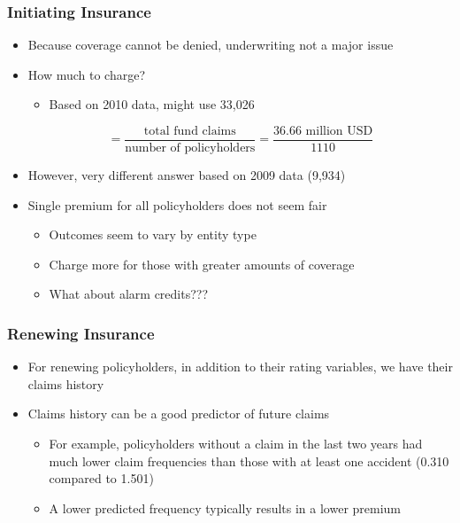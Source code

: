 \documentclass[serif,10pt]{beamer}
\begin{document}
\begin{frame}
\frametitle{Initiating Insurance}
  \begin{itemize}
\item Because coverage cannot be denied, underwriting not a major
issue \vspace{2mm}
\item How much to charge? \vspace{2mm}
  \begin{itemize}
\item Based on 2010 data, might use  33,026 \vspace{2mm}\end{itemize}
$$= \frac{{\text{total fund claims}}}{{\text{number of policyholders}}} = \frac{{\text{36.66 million
USD}}}{1110}$$ \vspace{2mm}
\item However, very different answer based on 2009 data (9,934) \vspace{2mm}
\item Single premium for all policyholders does not seem fair \vspace{2mm}
\begin{itemize}
\item Outcomes seem to vary by entity type \vspace{2mm}
\item Charge more for those with greater amounts of coverage \vspace{2mm}
\item What about alarm credits???
\end{itemize}\end{itemize}
\end{frame}

\begin{frame}
\frametitle{Renewing Insurance}
  \begin{itemize}
\item For renewing policyholders, in addition to their rating variables, we have their claims
history \vspace{2mm}
\item Claims history can be a good predictor of future claims \vspace{2mm}
  \begin{itemize}\item For example,  policyholders without a claim in the last two years had much lower claim frequencies than those with at least one accident (0.310 compared to
  1.501) \vspace{2mm}
  \item A lower predicted frequency typically results in a lower
  premium \vspace{2mm}
\end{itemize}\end{itemize}
\end{frame}
\end{document}
